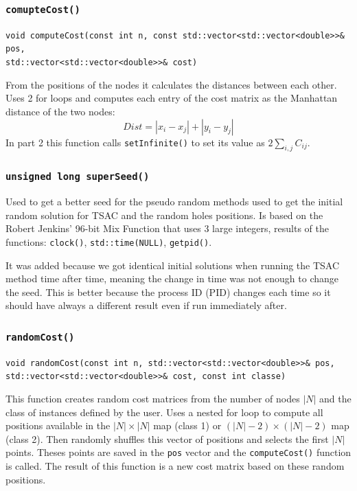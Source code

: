 \documentclass[a4paper,12pt]{article}
\begin{document}
			\subsubsection{\texttt{comupteCost()}}
				\hspace{-20pt}\texttt{void computeCost(const int n, const std::vector<std::vector<double>>\& pos, \\ std::vector<std::vector<double>>\& cost)}
					
				From the positions of the nodes it calculates the distances between each other.
				Uses 2 for loops and computes each entry of the cost matrix as the Manhattan distance of the two nodes:
					$$ Dist = |x_i-x_j| + |y_i-y_j| $$
				In part 2 this function calls \texttt{setInfinite()} to set its value as $ 2 \sum_{i,j} C_{ij}  $.
					
			\subsubsection{\texttt{unsigned long superSeed()}}
				Used to get a better seed for the pseudo random methods used to get the initial random solution for TSAC and the random holes positions.
				Is based on the Robert Jenkins' 96-bit Mix Function that uses 3 large integers, results of the functions: \texttt{clock()}, \texttt{std::time(NULL)}, \texttt{getpid()}.
				
				It was added because we got identical initial solutions when running the TSAC method time after time, meaning the change in time was not enough to change the seed.
				This is better because the process ID (PID) changes each time so it should have always a different result even if run immediately after.
				
			\subsubsection{\texttt{randomCost()}}
				\hspace{-20pt}\texttt{void randomCost(const int n, std::vector<std::vector<double>>\& pos, \\ std::vector<std::vector<double>>\& cost, const int classe)}
				
				This function creates random cost matrices from the number of nodes $ |N| $ and the class of instances defined by the user.
				Uses a nested for loop to compute all positions available in the $ |N| \times |N|  $ map (class 1) or $ (|N|-2) \times (|N|-2)  $  map (class 2).
				Then randomly shuffles this vector of positions and selects the first $ |N| $ points.
				Theses points are saved in the \texttt{pos} vector and the \texttt{computeCost()} function is called.
				The result of this function is a new cost matrix based on these random positions.
			
\end{document}
